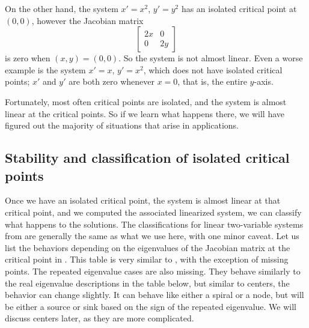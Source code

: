 On the other hand, the system $x' = x^2$, $y' = y^2$ has an isolated
critical point at $(0,0)$, however the Jacobian matrix
\begin{equation*}
\begin{bmatrix} 2x & 0 \\ 0 & 2y \end{bmatrix}
\end{equation*}
is zero when $(x,y) = (0,0)$.  So the system is not almost
linear. 
Even a worse example is the system $x' = x$, $y' = x^2$, which does not have 
isolated critical points; $x'$ and $y'$ are both zero
whenever $x=0$, that is, the entire $y$-axis.

Fortunately, most often critical
points are isolated, and the system is almost linear at the critical
points.  So if we learn what happens there, we will have figured out the majority
of situations that arise in applications.



\subsection{Stability and classification of isolated critical points}

Once we have an isolated critical point, the system is almost linear at
that critical point, and we computed the
associated linearized system, we can classify what happens to the 
solutions.  The classifications for linear
two-variable systems from  are generally the same as what we use here, with one minor
caveat.
Let us list the behaviors depending on the eigenvalues of
the Jacobian matrix at the critical point in .
This table is very similar to , with
the exception of missing  points.
The repeated eigenvalue cases are also missing. They behave similarly to the real eigenvalue descriptions
in the table below, but similar to centers, the behavior can change slightly.
It can behave like either a spiral or a node, but will be either a source or sink based on the sign of the repeated eigenvalue. 
We will discuss centers later, as they are more complicated.


